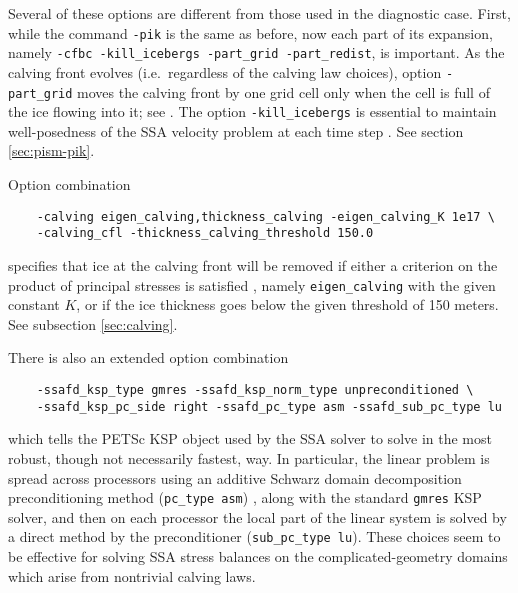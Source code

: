 Several of these options are different from those used in the diagnostic case.  First, while the command \texttt{-pik} is the same as before, now each part of its expansion, namely \texttt{-cfbc -kill_icebergs -part_grid -part_redist}, is important.  As the calving front evolves (i.e.~regardless of the calving law choices), option \texttt{-part_grid} moves the calving front by one grid cell only when the cell is full of the ice flowing into it; see \cite{Albrechtetal2011}.  The option \texttt{-kill_icebergs} is essential to maintain well-posedness of the SSA velocity problem at each time step \cite{Winkelmannetal2011}.  See section \ref{sec:pism-pik}.

Option combination
\begin{verbatim}
    -calving eigen_calving,thickness_calving -eigen_calving_K 1e17 \
    -calving_cfl -thickness_calving_threshold 150.0
\end{verbatim}
specifies that ice at the calving front will be removed if either a criterion on the product of principal stresses is satisfied \cite{Levermannetal2012}, namely \texttt{eigen_calving} with the given constant $K$, or if the ice thickness goes below the given threshold of 150 meters.  See subsection \ref{sec:calving}.

There is also an extended option combination
\begin{verbatim}
    -ssafd_ksp_type gmres -ssafd_ksp_norm_type unpreconditioned \
    -ssafd_ksp_pc_side right -ssafd_pc_type asm -ssafd_sub_pc_type lu
\end{verbatim}
which tells the PETSc KSP object used by the SSA solver to solve in the most robust, though not necessarily fastest, way.  In particular, the linear problem is spread across processors using an additive Schwarz domain decomposition preconditioning method (\texttt{pc_type asm}) \cite{Smithetal1996}, along with the standard \texttt{gmres} KSP solver, and then on each processor the local part of the linear system is solved by a direct method by the preconditioner (\texttt{sub_pc_type lu}).  These choices seem to be effective for solving SSA stress balances on the complicated-geometry domains which arise from nontrivial calving laws.




